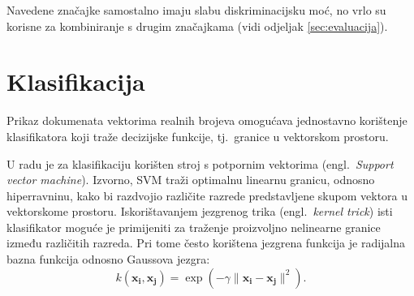 \documentclass[11pt,english]{article}
\newcommand{\engl}[1]{(engl.~\emph{#1})}
\begin{document}
\begin{multicols}{2}
Navedene značajke samostalno imaju slabu diskriminacijsku moć, no vrlo su korisne
za kombiniranje s drugim značajkama (vidi odjeljak \ref{sec:evaluacija}).

\section{Klasifikacija}
Prikaz dokumenata vektorima realnih brojeva omogućava jednostavno korištenje
klasifikatora koji traže decizijske funkcije, tj.~granice u vektorskom
prostoru.


U radu je za klasifikaciju korišten stroj s potpornim vektorima \engl{Support
vector machine}. Izvorno, SVM traži optimalnu linearnu granicu, odnosno
hiperravninu, kako bi razdvojio različite razrede predstavljene skupom vektora u
vektorskome prostoru. Iskorištavanjem jezgrenog trika \engl{kernel trick} isti
klasifikator moguće je primijeniti za traženje proizvoljno nelinearne granice
između različitih razreda. Pri tome često korištena jezgrena funkcija je
radijalna bazna funkcija odnosno Gaussova jezgra:
\begin{equation}
k(\mathbf{x_i},\mathbf{x_j})=\exp(-\gamma \|\mathbf{x_i} - \mathbf{x_j}\|^2).
\end{equation}


\end{multicols}
\end{document}
